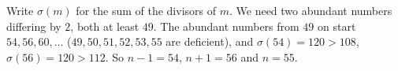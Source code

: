 Write $\sigma(m)$ for the sum of the divisors of $m$. We need two abundant numbers differing by $2$, both at least $49$. The abundant numbers from $49$ on start $54,56,60,\dots$ ($49,50,51,52,53,55$ are deficient), and $\sigma(54)=120>108$, $\sigma(56)=120>112$. So $n-1=54$, $n+1=56$ and $n=\boxed{55}$.
